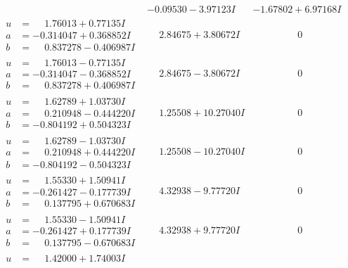 \documentclass[1p]{elsarticle_modified}
\theoremstyle{definition}
\begin{document}
$$\begin{array}{c|c|c}
 & -0.09530 - 3.97123 I & -1.67802 + 6.97168 I \\ \hline\begin{aligned}
u &= \phantom{-}1.76013 + 0.77135 I \\
a &= -0.314047 + 0.368852 I \\
b &= \phantom{-}0.837278 - 0.406987 I\end{aligned}
 & \phantom{-}2.84675 + 3.80672 I & \phantom{-0.000000 } 0 \\ \hline\begin{aligned}
u &= \phantom{-}1.76013 - 0.77135 I \\
a &= -0.314047 - 0.368852 I \\
b &= \phantom{-}0.837278 + 0.406987 I\end{aligned}
 & \phantom{-}2.84675 - 3.80672 I & \phantom{-0.000000 } 0 \\ \hline\begin{aligned}
u &= \phantom{-}1.62789 + 1.03730 I \\
a &= \phantom{-}0.210948 - 0.444220 I \\
b &= -0.804192 + 0.504323 I\end{aligned}
 & \phantom{-}1.25508 + 10.27040 I & \phantom{-0.000000 } 0 \\ \hline\begin{aligned}
u &= \phantom{-}1.62789 - 1.03730 I \\
a &= \phantom{-}0.210948 + 0.444220 I \\
b &= -0.804192 - 0.504323 I\end{aligned}
 & \phantom{-}1.25508 - 10.27040 I & \phantom{-0.000000 } 0 \\ \hline\begin{aligned}
u &= \phantom{-}1.55330 + 1.50941 I \\
a &= -0.261427 - 0.177739 I \\
b &= \phantom{-}0.137795 + 0.670683 I\end{aligned}
 & \phantom{-}4.32938 - 9.77720 I & \phantom{-0.000000 } 0 \\ \hline\begin{aligned}
u &= \phantom{-}1.55330 - 1.50941 I \\
a &= -0.261427 + 0.177739 I \\
b &= \phantom{-}0.137795 - 0.670683 I\end{aligned}
 & \phantom{-}4.32938 + 9.77720 I & \phantom{-0.000000 } 0 \\ \hline\begin{aligned}
u &= \phantom{-}1.42000 + 1.74003 I \\

\end{aligned}
\end{array}$$
\end{document}
